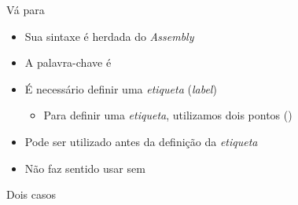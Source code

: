 \documentclass[14pt]{beamer}
\begin{document}
		\begin{frame}{Vá para}
			\begin{itemize}
				\presentationPause\item Sua sintaxe é herdada do \textit{Assembly}
				\presentationPause\item A palavra-chave é 
				\presentationPause\item É necessário definir uma \emph{etiqueta} (\textit{label})
				\begin{itemize}
					\presentationPause\item Para definir uma \emph{etiqueta}, utilizamos dois pontos (\basicCode{:})
				\end{itemize}
				\presentationPause\item Pode ser utilizado antes da definição da \emph{etiqueta}
			\end{itemize}
			\presentationPause
			\begin{itemize}
				\presentationPause\item Não faz sentido usar sem 
			\end{itemize}
		\end{frame}

		\begin{frame}{Dois casos}
			\begin{columns}
				\begin{column}{.5\textwidth}
					\only<1>{}
					\only<2>{}
				\end{column}
				\begin{column}{.5\textwidth}
					\only<1>{}
					\only<2>{}
				\end{column}
			\end{columns}
		\end{frame}
\end{document}
